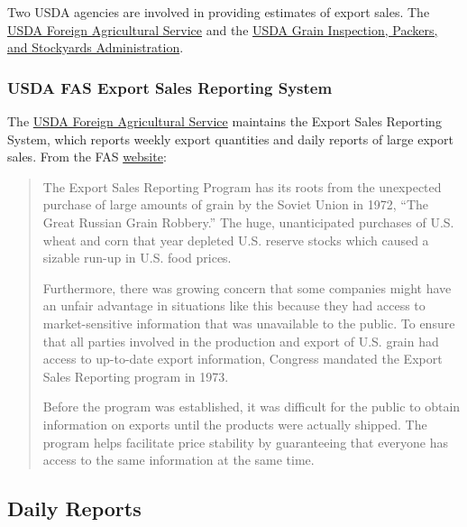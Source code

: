\documentclass[
]{book}
\begin{document}
Two USDA agencies are involved in providing estimates of export sales. The \href{http://www.fas.usda.gov/}{USDA Foreign Agricultural Service} and the \href{http://www.gipsa.usda.gov/}{USDA Grain Inspection, Packers, and Stockyards Administration}.

\hypertarget{usda-fas-export-sales-reporting-system}{%
\subsubsection{USDA FAS Export Sales Reporting System}\label{usda-fas-export-sales-reporting-system}}

The \href{http://www.fas.usda.gov/}{USDA Foreign Agricultural Service} maintains the Export Sales Reporting System, which reports weekly export quantities and daily reports of large export sales. From the FAS \href{https://apps.fas.usda.gov/export-sales/FACT\%20SHEET.pdf}{website}:

\begin{quote}
The Export Sales Reporting Program has its roots from the unexpected purchase of large amounts of grain by the Soviet Union in 1972, ``The Great Russian Grain Robbery.'' The huge, unanticipated purchases of U.S. wheat and corn that year depleted U.S. reserve stocks which caused a sizable run-up in U.S. food prices.

Furthermore, there was growing concern that some companies might have an unfair advantage in situations like this because they had access to market-sensitive information that was unavailable to the public. To ensure that all parties involved in the production and export of U.S. grain had access to up-to-date export information, Congress mandated the Export Sales Reporting program in 1973.

Before the program was established, it was difficult for the public to obtain information on exports until the products were actually shipped. The program helps facilitate price stability by guaranteeing that everyone has access to the same information at the same time.
\end{quote}

\hypertarget{daily-reports}{%
\subsection{Daily Reports}\label{daily-reports}}
\end{document}
